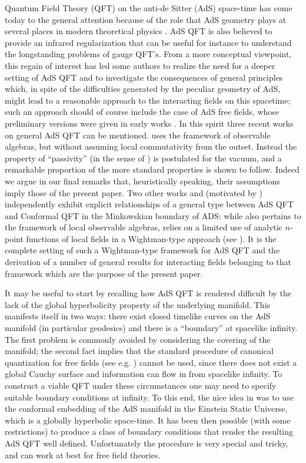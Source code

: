 \documentclass[a4paper,a4paper]{article}
\begin{document}
   Quantum Field Theory (QFT) on  the anti-de Sitter (AdS)
space-time has come today to the general attention because of the
role that AdS geometry plays at several places in modern
theoretical physics  \cite{maldacena,RS}. AdS QFT is also
believed to provide an infrared regularization \cite{wilczek}
that can be useful for instance to understand the longstanding
problems of gauge QFT's. From a more conceptual viewpoint,
this regain of interest has led some authors to realize the need
for a deeper setting of AdS QFT and to investigate
the consequences of general principles
which, in spite of the difficulties generated by the
peculiar geometry of AdS,
might lead to a reasonable approach to
the interacting fields on this spacetime;
such an approach should of course include the case of AdS free fields,
whose preliminary versions were
given in early works \cite{Avis} \cite{Fronsdal:1974}.
In this spirit three recent works on general AdS QFT
can be mentioned.
\cite{BFS} uses the framework of observable algebras, but
without assuming local commutativity from the outset. Instead
the property of ``passivity'' (in the sense of \cite{PW})
is postulated for the vacuum, and a remarkable proportion
of the more standard properties is shown to follow.
Indeed we argue in our final remarks that, heuristically
speaking, their assumptions imply those of the present paper.
Two other works \cite{Re} and \cite{BBMS}
(motivated by \cite{maldacena}) independently exhibit explicit relationships
of a general type between AdS QFT and Conformal QFT in the Minkowskian
boundary of ADS: while \cite{Re} also pertains to the
framework of local observable algebras,
\cite{BBMS}
relies on a limited use of analytic $n$-point functions of local fields
in a Wightman-type approach (see \cite{SW}).
It is the complete setting of such a
Wightman-type framework for AdS QFT
and the derivation of a number of general results
for interacting fields belonging to that framework
which are the purpose of the present paper.

\vskip 0.1cm
It may be useful to start by recalling how AdS QFT is rendered
difficult by the lack of the global hyperbolicity property of the
underlying manifold. This manifests itself in two ways:
there exist closed timelike curves on the AdS manifold (in
particular geodesics) and there is a ``boundary'' at spacelike
infinity. The first problem is commonly avoided by considering
the covering of the manifold; the second fact implies that the
standard procedure of canonical quantization for free fields (see
e.g. \cite{BD,wald}) cannot be used, since there does not exist a
global Cauchy surface and information can flow in from spacelike
infinity.
To construct a viable QFT under these circumstances one may need
to specify suitable boundary conditions at infinity. To this end,
the nice idea in \cite{Avis} was to use the conformal embedding
of the AdS manifold in the Einstein Static Universe, which is a
globally hyperbolic space-time. It has been then possible (with
some restrictions) to produce a class of boundary conditions that
render the resulting AdS QFT well defined. Unfortunately the
procedure is very special and tricky, and can work at best for
free field theories.
\end{document}
